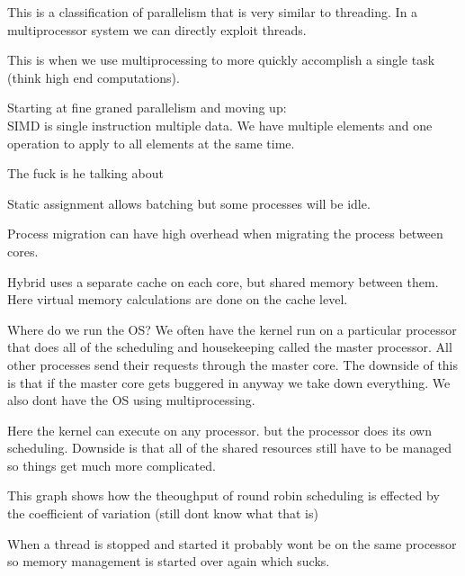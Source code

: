 \documentclass{article}
\begin{document}






This is a classification of parallelism that is very similar to threading. In a multiprocessor system we can directly exploit threads.

This is when we use multiprocessing to more quickly accomplish a single task (think high end computations).

Starting at fine graned parallelism and moving up:\\
SIMD is single instruction multiple data. We have multiple elements and one operation to apply to all elements at the same time.



The fuck is he talking about


Static assignment allows batching but some processes will be idle.

Process migration can have high overhead when migrating the  process between cores.

Hybrid uses a separate cache on each core, but shared memory between them. Here virtual memory calculations are done on the cache level.

Where do we run the OS? We often have the kernel run on a particular processor that does all of the scheduling and housekeeping called the master processor. All other processes send their requests through the master core. The downside of this is that if the master core gets buggered in anyway we take down everything. We also dont have the OS using multiprocessing.

Here the kernel can execute on any processor. but the processor does its own scheduling. Downside is that all of the shared resources still have to be managed so things get much more complicated.




This graph shows how the theoughput of round robin scheduling is effected by the coefficient of variation (still dont know what that is)




When a thread is stopped and started it probably wont be on the same processor so memory management is started over again which sucks.
\end{document}
